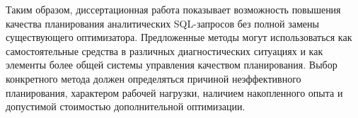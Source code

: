 Таким образом, диссертационная работа показывает возможность повышения качества планирования аналитических SQL-запросов без полной замены существующего оптимизатора. Предложенные методы могут использоваться как самостоятельные средства в различных диагностических ситуациях и как элементы более общей системы управления качеством планирования. Выбор конкретного метода должен определяться причиной неэффективного планирования, характером рабочей нагрузки, наличием накопленного опыта и допустимой стоимостью дополнительной оптимизации.
